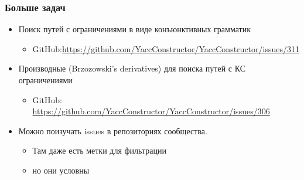 \documentclass{beamer}
\begin{document}
\begin{frame}[fragile]
\transwipe[direction=90]
\frametitle{Больше задач}
                 
  \begin{itemize}
    \item Поиск путей с ограничениями в виде конъюнктивных грамматик
    \begin{itemize}
         \item GitHub:\url{https://github.com/YaccConstructor/YaccConstructor/issues/311}
    \end{itemize}

    \item Производные (Brzozowski’s derivatives) для поиска путей с КС ограничениями
    \begin{itemize}
         \item GitHub: \url{https://github.com/YaccConstructor/YaccConstructor/issues/306}
    \end{itemize}

    \item Можно поизучать issues в репозиториях сообщества.
    \begin{itemize}
         \item Там даже есть метки для фильтрации
         \item но они условны
    \end{itemize}

  \end{itemize}
  
\end{frame}
\end{document}
